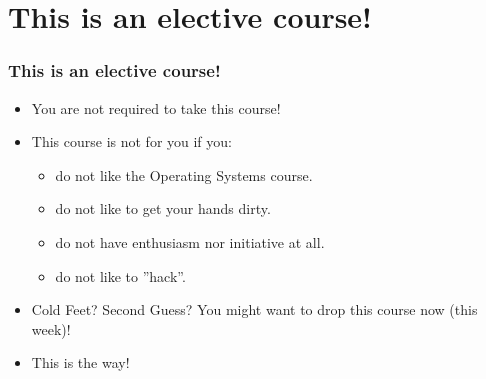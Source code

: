 \documentclass[aspectratio=169, xcolor=table, notheorems, hyperref={pdfpagelabels=false}]{beamer}
\begin{document}
\section{This is an elective course!}
\begin{frame}[fragile]
\frametitle{This is an elective course!}

\begin{itemize}
\item You are not required to take this course!
\item This course is not for you if you:
\begin{itemize}
\item do not like the Operating Systems course.
\item do not like to get your hands dirty.
\item do not have enthusiasm nor initiative at all.
\item do not like to ''hack''.
\end{itemize}
\item Cold Feet? Second Guess?  You might want to drop this course now (this week)!
\item This is the way!
\end{itemize}

\end{frame}

\end{document}
